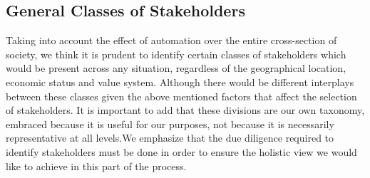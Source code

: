 \subsection{General Classes of Stakeholders}
\label{sec:-general}
Taking into account the effect of automation over the entire cross-section of society, we think it is prudent to identify certain classes of stakeholders which would be present across any situation, regardless of the geographical location, economic status and value system. Although there would be different interplays between these classes given the above mentioned factors that affect the selection of stakeholders.
It is important to add that these divisions are our own taxonomy, embraced because it is useful for our purposes, not because it is necessarily representative at all levels.We emphasize that the due diligence required to identify stakeholders must be done in order to ensure the holistic view we would like to achieve in this part of the process.
